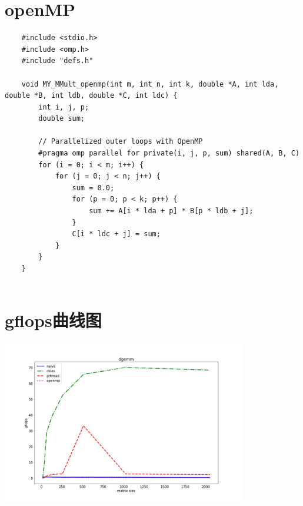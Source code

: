\documentclass{article} %
\begin{document}
\section{openMP}
\begin{verbatim}
    #include <stdio.h>
    #include <omp.h>
    #include "defs.h"
    
    void MY_MMult_openmp(int m, int n, int k, double *A, int lda, double *B, int ldb, double *C, int ldc) {
        int i, j, p;
        double sum;
    
        // Parallelized outer loops with OpenMP
        #pragma omp parallel for private(i, j, p, sum) shared(A, B, C)
        for (i = 0; i < m; i++) {
            for (j = 0; j < n; j++) {
                sum = 0.0;
                for (p = 0; p < k; p++) {
                    sum += A[i * lda + p] * B[p * ldb + j];
                }
                C[i * ldc + j] = sum;
            }
        }
    }
    
\end{verbatim}


\section{gﬂops曲线图}
\includegraphics[width=0.8\textwidth]{result.png}

$$
$$
\end{document}

